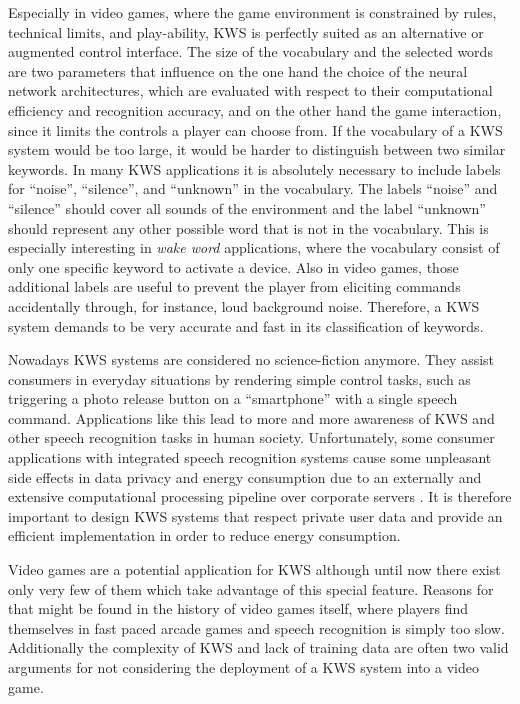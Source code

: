 Especially in video games, where the game environment is constrained by rules, technical limits, and play-ability, KWS is perfectly suited as an alternative or augmented control interface.
The size of the vocabulary and the selected words are two parameters that influence on the one hand the choice of the neural network architectures, which are evaluated with respect to their computational efficiency and recognition accuracy, and on the other hand the game interaction, since it limits the controls a player can choose from.
If the vocabulary of a KWS system would be too large, it would be harder to distinguish between two similar keywords.
In many KWS applications it is absolutely necessary to include labels for \enquote{noise}, \enquote{silence}, and \enquote{unknown} in the vocabulary.
The labels \enquote{noise} and \enquote{silence} should cover all sounds of the environment and the label \enquote{unknown} should represent any other possible word that is not in the vocabulary.
This is especially interesting in \emph{wake word} applications, where the vocabulary consist of only one specific keyword to activate a device.
Also in video games, those additional labels are useful to prevent the player from eliciting commands accidentally through, for instance, loud background noise.
Therefore, a KWS system demands to be very accurate and fast in its classification of keywords.

Nowadays KWS systems are considered no science-fiction anymore.
They assist consumers in everyday situations by rendering simple control tasks, such as triggering a photo release button on a \enquote{smartphone} with a single speech command.
Applications like this lead to more and more awareness of KWS and other speech recognition tasks in human society.
Unfortunately, some consumer applications with integrated speech recognition systems cause some unpleasant side effects in data privacy and energy consumption due to an externally and extensive computational processing pipeline over corporate servers \cite{Tang2018}.
It is therefore important to design KWS systems that respect private user data and provide an efficient implementation in order to reduce energy consumption.

Video games are a potential application for KWS although until now there exist only very few of them which take advantage of this special feature.
Reasons for that might be found in the history of video games itself, where players find themselves in fast paced arcade games and speech recognition is simply too slow.
Additionally the complexity of KWS and lack of training data are often two valid arguments for not considering the deployment of a KWS system into a video game.

